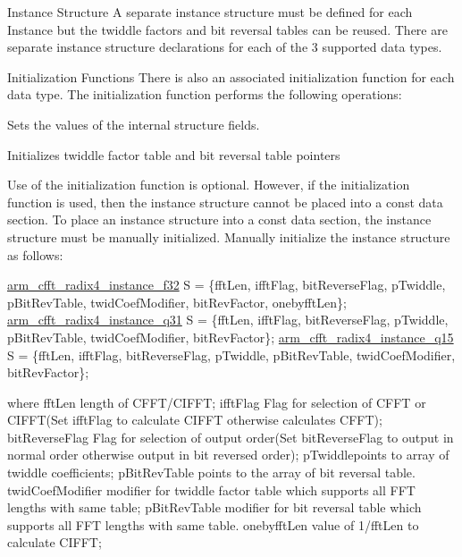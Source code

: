 \begin{DoxyParagraph}{Instance Structure }
A separate instance structure must be defined for each Instance but the twiddle factors and bit reversal tables can be reused. There are separate instance structure declarations for each of the 3 supported data types.
\end{DoxyParagraph}
\begin{DoxyParagraph}{Initialization Functions }
There is also an associated initialization function for each data type. The initialization function performs the following operations\-:
\begin{DoxyItemize}
\item Sets the values of the internal structure fields.
\item Initializes twiddle factor table and bit reversal table pointers 
\end{DoxyItemize}
\end{DoxyParagraph}
\begin{DoxyParagraph}{}
Use of the initialization function is optional. However, if the initialization function is used, then the instance structure cannot be placed into a const data section. To place an instance structure into a const data section, the instance structure must be manually initialized. Manually initialize the instance structure as follows\-: 
\begin{DoxyPre}   
\hyperlink{structarm__cfft__radix4__instance__f32}{arm\_cfft\_radix4\_instance\_f32} S = \{fftLen, ifftFlag, bitReverseFlag, pTwiddle, pBitRevTable, twidCoefModifier, bitRevFactor, onebyfftLen\};   
\hyperlink{structarm__cfft__radix4__instance__q31}{arm\_cfft\_radix4\_instance\_q31} S = \{fftLen, ifftFlag, bitReverseFlag, pTwiddle, pBitRevTable, twidCoefModifier, bitRevFactor\};   
\hyperlink{structarm__cfft__radix4__instance__q15}{arm\_cfft\_radix4\_instance\_q15} S = \{fftLen, ifftFlag, bitReverseFlag, pTwiddle, pBitRevTable, twidCoefModifier, bitRevFactor\};   
 \end{DoxyPre}
 
\end{DoxyParagraph}
\begin{DoxyParagraph}{}
where {\ttfamily fft\-Len} length of C\-F\-F\-T/\-C\-I\-F\-F\-T; {\ttfamily ifft\-Flag} Flag for selection of C\-F\-F\-T or C\-I\-F\-F\-T(\-Set ifft\-Flag to calculate C\-I\-F\-F\-T otherwise calculates C\-F\-F\-T); {\ttfamily bit\-Reverse\-Flag} Flag for selection of output order(\-Set bit\-Reverse\-Flag to output in normal order otherwise output in bit reversed order); {\ttfamily p\-Twiddle}points to array of twiddle coefficients; {\ttfamily p\-Bit\-Rev\-Table} points to the array of bit reversal table. {\ttfamily twid\-Coef\-Modifier} modifier for twiddle factor table which supports all F\-F\-T lengths with same table; {\ttfamily p\-Bit\-Rev\-Table} modifier for bit reversal table which supports all F\-F\-T lengths with same table. {\ttfamily onebyfft\-Len} value of 1/fft\-Len to calculate C\-I\-F\-F\-T;
\end{DoxyParagraph}
